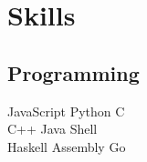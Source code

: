 \documentclass[letterpaper]{deedy-resume} %
\begin{document}
\begin{minipage}[t]{0.33\textwidth}

    \section{Skills}

    \subsection{Programming}

    JavaScript \textbullet{} Python \textbullet{} C \\
    \sectionspace
    C++ \textbullet{} Java \textbullet{} Shell \\
    \textbullet{} Haskell \textbullet{} Assembly \textbullet{} Go

    \sectionspace %


  \end{minipage} %
  \hfill
\end{document}
